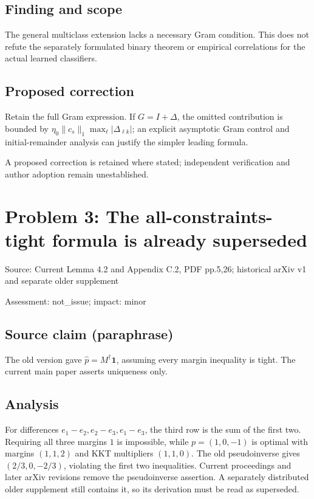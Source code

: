 \documentclass[11pt]{article}
\begin{document}
\subsection*{Finding and scope}

The general multiclass extension lacks a necessary Gram condition. This does not refute the separately formulated binary theorem or empirical correlations for the actual learned classifiers.

\subsection*{Proposed correction}

Retain the full Gram expression. If \(G=I+\Delta\), the omitted contribution is bounded by \(\eta_0\|c_s\|_1\max_\ell|\Delta_{\ell k}|\); an explicit asymptotic Gram control and initial-remainder analysis can justify the simpler leading formula.

A proposed correction is retained where stated; independent verification and author adoption remain unestablished.

\section*{Problem 3: The all-constraints-tight formula is already superseded}

Source: Current Lemma 4.2 and Appendix C.2, PDF pp.5,26; historical arXiv v1 and separate older supplement

Assessment: not\_issue; impact: minor

\subsection*{Source claim (paraphrase)}

The old version gave \(\widehat p=M^\dagger\mathbf1\), assuming every margin inequality is tight. The current main paper asserts uniqueness only.

\subsection*{Analysis}

For differences \(e_1-e_2,e_2-e_3,e_1-e_3\), the third row is the sum of the first two. Requiring all three margins \(1\) is impossible, while \(p=(1,0,-1)\) is optimal with margins \((1,1,2)\) and KKT multipliers \((1,1,0)\). The old pseudoinverse gives \((2/3,0,-2/3)\), violating the first two inequalities. Current proceedings and later arXiv revisions remove the pseudoinverse assertion. A separately distributed older supplement still contains it, so its derivation must be read as superseded.
\end{document}
